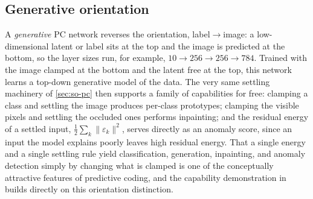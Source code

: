 \subsection{Generative orientation}

A \emph{generative} PC network reverses the orientation, label$\to$image: a low-dimensional latent
or label sits at the top and the image is predicted at the bottom, so the layer sizes run, for
example, $10 \to 256 \to 256 \to 784$. Trained with the image clamped at the bottom and the
latent free at the top, this network learns a top-down generative model of the data. The very same
settling machinery of \cref{sec:so-pc} then supports a family of capabilities for free: clamping a
class and settling the image produces per-class prototypes; clamping the visible pixels and
settling the occluded ones performs inpainting; and the residual energy of a settled input,
$\tfrac{1}{2}\sum_k\lVert\varepsilon_k\rVert^2$, serves directly as an anomaly score, since an
input the model explains poorly leaves high residual energy. That a single energy and a single
settling rule yield classification, generation, inpainting, and anomaly detection simply by
changing what is clamped is one of the conceptually attractive features of predictive coding, and
the capability demonstration in  builds directly on this orientation distinction.
